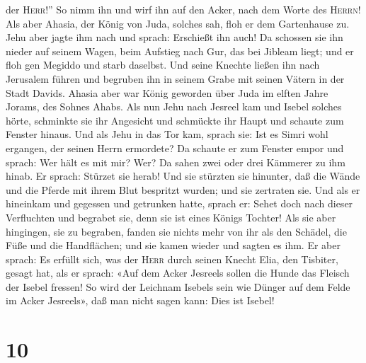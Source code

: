 der \textsc{Herr}!'' So nimm ihn und wirf ihn auf den Acker, nach dem
Worte des \textsc{Herrn}!  Als aber Ahasia, der König von
Juda, solches sah, floh er dem Gartenhause zu. Jehu aber jagte ihm nach
und sprach: Erschießt ihn auch! Da schossen sie ihn nieder auf seinem
Wagen, beim Aufstieg nach Gur, das bei Jibleam liegt; und er floh gen
Megiddo und starb daselbst.  Und seine Knechte ließen ihn
nach Jerusalem führen und begruben ihn in seinem Grabe mit seinen Vätern
in der Stadt Davids.  Ahasia aber war König geworden über
Juda im elften Jahre Jorams, des Sohnes Ahabs.  Als nun
Jehu nach Jesreel kam und Isebel solches hörte, schminkte sie ihr
Angesicht und schmückte ihr Haupt und schaute zum Fenster hinaus.
 Und als Jehu in das Tor kam, sprach sie: Ist es Simri
wohl ergangen, der seinen Herrn ermordete?  Da schaute er
zum Fenster empor und sprach: Wer hält es mit mir? Wer? Da sahen zwei
oder drei Kämmerer zu ihm hinab.  Er sprach: Stürzet sie
herab! Und sie stürzten sie hinunter, daß die Wände und die Pferde mit
ihrem Blut bespritzt wurden; und sie zertraten sie.  Und
als er hineinkam und gegessen und getrunken hatte, sprach er: Sehet doch
nach dieser Verfluchten und begrabet sie, denn sie ist eines Königs
Tochter!  Als sie aber hingingen, sie zu begraben, fanden
sie nichts mehr von ihr als den Schädel, die Füße und die Handflächen;
 und sie kamen wieder und sagten es ihm. Er aber sprach:
Es erfüllt sich, was der \textsc{Herr} durch seinen Knecht Elia, den
Tisbiter, gesagt hat, als er sprach: «Auf dem Acker Jesreels sollen die
Hunde das Fleisch der Isebel fressen!  So wird der
Leichnam Isebels sein wie Dünger auf dem Felde im Acker Jesreels», daß
man nicht sagen kann: Dies ist Isebel!

\hypertarget{section-9}{%
\section{10}\label{section-9}}

